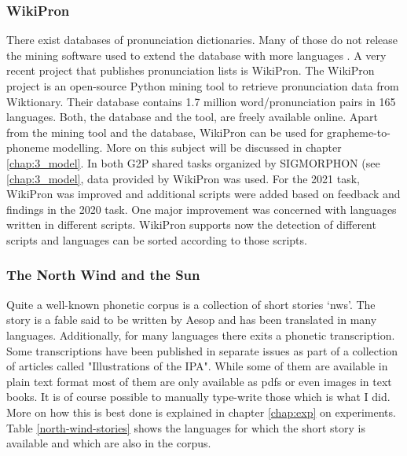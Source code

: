 \subsubsection*{WikiPron}
There exist databases of pronunciation dictionaries. Many of those do not release the mining software used to extend the database with more languages \citep{Lee&Ashby.2020}. A very recent project that publishes pronunciation lists is WikiPron. The WikiPron project \citep{Lee&Ashby.2020} is an open-source Python mining tool to retrieve pronunciation data from Wiktionary. Their database contains 1.7 million word/pronunciation pairs in 165 languages. Both, the database and the tool, are freely available online. Apart from the mining tool and the database, WikiPron can be used for grapheme-to-phoneme modelling. More on this subject will be discussed in chapter \ref{chap:3_model}.
In both G2P shared tasks organized by SIGMORPHON (see \ref{chap:3_model}, data provided by WikiPron was used. For the 2021 task, WikiPron was improved and additional scripts were added based on feedback and findings in the 2020 task. One major improvement was concerned with languages written in different scripts. WikiPron supports now the detection of different scripts and languages can be sorted according to those scripts.


\subsubsection*{The North Wind and the Sun}
\label{nws}
Quite a well-known phonetic corpus is a collection of short stories `\ac{nws}'. The story is a fable said to be written by Aesop and has been translated in many languages. Additionally, for many languages there exits a phonetic transcription. 
Some transcriptions have been published in separate issues as part of a collection of articles called "Illustrations of the IPA". While some of them are available in plain text format most of them are only available as pdfs or even images in text books. It is of course possible to manually type-write those which is what I did. More on how this is best done is explained in chapter \ref{chap:exp} on experiments. Table \ref{north-wind-stories} shows the languages for which the short story is available and which are also in the corpus.
\citep{baird_evans_greenhill_2021}

